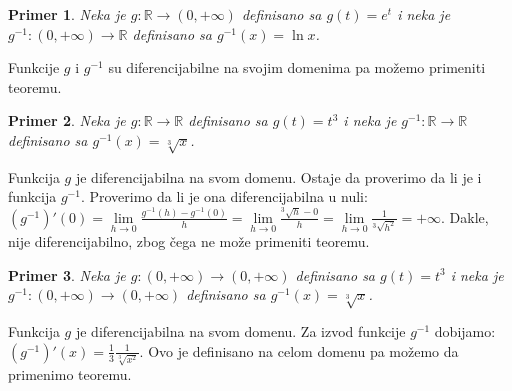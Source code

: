 \documentclass{article}
\newtheorem{prim}{Primer}[section]
\begin{document}
\begin{primbox}
    \begin{prim}
        Neka je $g: \mathbb{R} \longrightarrow (0, +\infty)$ definisano sa
        $g(t) = e^t$ i neka je $g^{-1}:(0, +\infty)\longrightarrow \mathbb{R}$
        definisano sa $g^{-1}(x) = \ln{x}$.
    \end{prim}
    Funkcije $g$ i $g^{-1}$
    su diferencijabilne na svojim domenima pa možemo primeniti teoremu.
\end{primbox}
\begin{primbox}
    \begin{prim}
        Neka je $g:\mathbb{R}\longrightarrow\mathbb{R}$
        definisano sa $g(t) = t^3$ i neka je $g^{-1}:\mathbb{R}\longrightarrow\mathbb{R}$
        definisano sa $g^{-1}(x) = \sqrt[3]{x}$.
    \end{prim}
    Funkcija $g$ je diferencijabilna
    na svom domenu. Ostaje da proverimo da li je i funkcija $g^{-1}$. Proverimo da li je ona diferencijabilna u nuli:
    $(g^{-1})'(0) = \lim\limits_{h\longrightarrow 0}\frac{g^{-1}(h) - g^{-1}(0)}{h} = \lim\limits_{h\longrightarrow 0}\frac{^3\sqrt{h} - 0}{h} = \lim\limits_{h\longrightarrow 0}\frac{1}{^3\sqrt{h^2}} = +\infty$.
    Dakle, nije diferencijabilno, zbog čega ne može primeniti teoremu.\par
\end{primbox}
\begin{primbox}
    \begin{prim}
        Neka je $g: (0, +\infty) \longrightarrow (0, +\infty)$
        definisano sa $ g(t) = t^3$ i neka je $g^{-1}: (0,+\infty)\longrightarrow(0,+\infty)$
        definisano sa $ g^{-1}(x) = \sqrt[3]{x}$.
    \end{prim}
    Funkcija $g$ je diferencijabilna na svom domenu.
    Za izvod funkcije $g^{-1}$ dobijamo: $(g^{-1})'(x) = \frac{1}{3}\frac{1}{\sqrt[3]{x^2}}$.
    Ovo je definisano na celom domenu pa možemo da primenimo teoremu.\par
\end{primbox}
\end{document}
